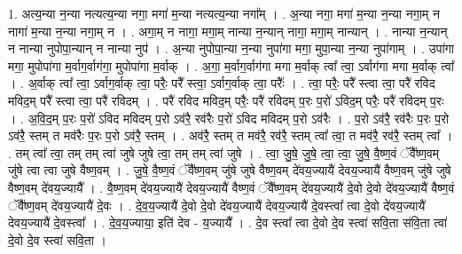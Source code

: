 \documentclass[17pt]{extarticle}
\begin{document}
1. अत्य॒न्या न॒न्या नत्यत्य॒न्या नगा॒ मगा॑ म॒न्या नत्यत्य॒न्या नगा᳚म् । . अ॒न्या नगा॒ मगा॑ म॒न्या न॒न्या नगा॒म् न नागा॑ म॒न्या न॒न्या नगा॒म् न । . अगा॒म् न नागा॒ मगा॒म् नान्या न॒न्यान् नागा॒ मगा॒म् नान्यान् । . नान्या न॒न्यान् न नान्या नुपोपा॒न्यान् न नान्या नुप॑ । . अ॒न्या नुपोपा॒न्या न॒न्या नुपा॑गा मगा॒ मुपा॒न्या न॒न्या नुपा॑गाम् । . उपा॑गा मगा॒ मुपोपा॑गा म॒र्वाग॒र्वाग॑गा॒ मुपोपा॑गा म॒र्वाक् । . अ॒गा॒ म॒र्वाग॒र्वाग॑गा मगा म॒र्वाक् त्वा᳚ त्वा॒ ऽर्वाग॑गा मगा म॒र्वाक् त्वा᳚ । . अ॒र्वाक् त्वा᳚ त्वा॒ ऽर्वाग॒र्वाक् त्वा॒ परैः॒ परै᳚ स्त्वा॒ ऽर्वाग॒र्वाक् त्वा॒ परैः᳚ । . त्वा॒ परैः॒ परै᳚ स्त्वा त्वा॒ परै॑ रविद मविद॒म् परै᳚ स्त्वा त्वा॒ परै॑ रविदम् । . परै॑ रविद मविद॒म् परैः॒ परै॑ रविदम् प॒रः प॒रो॑ ऽविद॒म् परैः॒ परै॑ रविदम् प॒रः । . अ॒वि॒द॒म् प॒रः प॒रो॑ ऽविद मविदम् प॒रो ऽव॑रै॒ रव॑रैः प॒रो॑ ऽविद मविदम् प॒रो ऽव॑रैः । . प॒रो ऽव॑रै॒ रव॑रैः प॒रः प॒रो ऽव॑रै॒ स्तम् त मव॑रैः प॒रः प॒रो ऽव॑रै॒ स्तम् । . अव॑रै॒ स्तम् त मव॑रै॒ रव॑रै॒ स्तम् त्वा᳚ त्वा॒ त मव॑रै॒ रव॑रै॒ स्तम् त्वा᳚ । . तम् त्वा᳚ त्वा॒ तम् तम् त्वा॑ जुषे जुषे त्वा॒ तम् तम् त्वा॑ जुषे । . त्वा॒ जु॒षे॒ जु॒षे॒ त्वा॒ त्वा॒ जु॒षे॒ वै॒ष्ण॒वं ॅवै᳚ष्ण॒वम् जु॑षे त्वा त्वा जुषे वैष्ण॒वम् । . जु॒षे॒ वै॒ष्ण॒वं ॅवै᳚ष्ण॒वम् जु॑षे जुषे वैष्ण॒वम् दे॑वय॒ज्यायै॑ देवय॒ज्यायै॑ वैष्ण॒वम् जु॑षे जुषे वैष्ण॒वम् दे॑वय॒ज्यायै᳚ । . वै॒ष्ण॒वम् दे॑वय॒ज्यायै॑ देवय॒ज्यायै॑ वैष्ण॒वं ॅवै᳚ष्ण॒वम् दे॑वय॒ज्यायै॑ दे॒वो दे॒वो दे॑वय॒ज्यायै॑ वैष्ण॒वं ॅवै᳚ष्ण॒वम् दे॑वय॒ज्यायै॑ दे॒वः । . दे॒व॒य॒ज्यायै॑ दे॒वो दे॒वो दे॑वय॒ज्यायै॑ देवय॒ज्यायै॑ दे॒वस्त्वा᳚ त्वा दे॒वो दे॑वय॒ज्यायै॑ देवय॒ज्यायै॑ दे॒वस्त्वा᳚ । . दे॒व॒य॒ज्याया॒ इति॑ देव - य॒ज्यायै᳚ । . दे॒व स्त्वा᳚ त्वा दे॒वो दे॒व स्त्वा॑ सवि॒ता स॑वि॒ता त्वा॑ दे॒वो दे॒व स्त्वा॑ सवि॒ता । \newline
\end{document}

